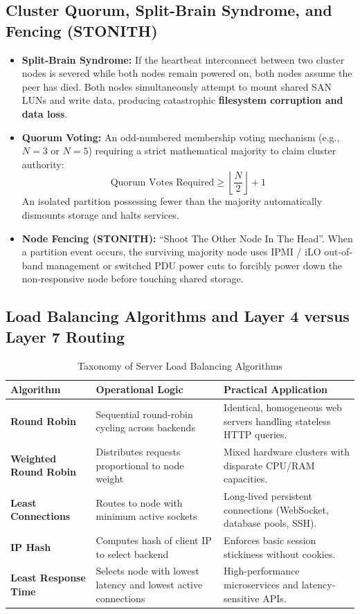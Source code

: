 \subsection{Cluster Quorum, Split-Brain Syndrome, and Fencing (STONITH)}
\begin{itemize}
    \item \textbf{Split-Brain Syndrome:} If the heartbeat interconnect between two cluster nodes is severed while both nodes remain powered on, both nodes assume the peer has died. Both nodes simultaneously attempt to mount shared SAN LUNs and write data, producing catastrophic \textbf{filesystem corruption and data loss}.
    \item \textbf{Quorum Voting:} An odd-numbered membership voting mechanism (e.g., $N = 3$ or $N = 5$) requiring a strict mathematical majority to claim cluster authority:
    \begin{equation}
    \boxed{\text{Quorum Votes Required} \ge \left\lfloor \frac{N}{2} \right\rfloor + 1}
    \end{equation}
    An isolated partition possessing fewer than the majority automatically dismounts storage and halts services.
    \item \textbf{Node Fencing (STONITH):} ``Shoot The Other Node In The Head''. When a partition event occurs, the surviving majority node uses IPMI / iLO out-of-band management or switched PDU power cuts to forcibly power down the non-responsive node before touching shared storage.
\end{itemize}

\subsection{Load Balancing Algorithms and Layer 4 versus Layer 7 Routing}
\begin{table}[htbp]
\centering
\small
\caption{Taxonomy of Server Load Balancing Algorithms}
\label{tab:load_balancing_algorithms}
\begin{tabularx}{\textwidth}{l p{4.2cm} X}
\toprule
\textbf{Algorithm} & \textbf{Operational Logic} & \textbf{Practical Application} \\
\midrule
\textbf{Round Robin} & Sequential round-robin cycling across backends & Identical, homogeneous web servers handling stateless HTTP queries. \\
\textbf{Weighted Round Robin} & Distributes requests proportional to node weight & Mixed hardware clusters with disparate CPU/RAM capacities. \\
\textbf{Least Connections} & Routes to node with minimum active sockets & Long-lived persistent connections (WebSocket, database pools, SSH). \\
\textbf{IP Hash} & Computes hash of client IP to select backend & Enforces basic session stickiness without cookies. \\
\textbf{Least Response Time} & Selects node with lowest latency and lowest active connections & High-performance microservices and latency-sensitive APIs. \\
\bottomrule
\end{tabularx}
\end{table}

